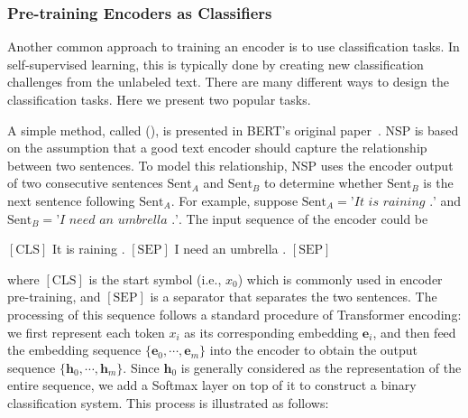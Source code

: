 \subsubsection{Pre-training Encoders as Classifiers}
\label{sec:pre-training-as-classification}

\noindent Another common approach to training an encoder is to use classification tasks. In self-supervised learning, this is typically done by creating new classification challenges from the unlabeled text. There are many different ways to design the classification tasks. Here we present two popular tasks.

A simple method, called  (), is presented in BERT's original paper~\cite{devlin-etal:2019bert}. NSP is based on the assumption that a good text encoder should capture the relationship between two sentences. To model this relationship, NSP uses the encoder output of two consecutive sentences $\mathrm{Sent}_{A}$ and $\mathrm{Sent}_{B}$ to determine whether $\mathrm{Sent}_{B}$ is the next sentence following $\mathrm{Sent}_{A}$. For example, suppose $\mathrm{Sent}_{A} = \textit{'It is raining .'}$ and $\mathrm{Sent}_{B} = \textit{'I need an umbrella .'}$. The input sequence of the encoder could be

\vspace{0.5em}
\begin{center}
$[\mathrm{CLS}]$ It is raining . $[\mathrm{SEP}]$ I need an umbrella . $[\mathrm{SEP}]$
\end{center}
\vspace{0.5em}

\noindent where $[\mathrm{CLS}]$ is the start symbol (i.e., $x_0$) which is commonly used in encoder pre-training, and $[\mathrm{SEP}]$ is a separator that separates the two sentences. The processing of this sequence follows a standard procedure of Transformer encoding: we first represent each token $x_i$ as its corresponding embedding $\mathbf{e}_i$, and then feed the embedding sequence $\{\mathbf{e}_{0},\cdots,\mathbf{e}_m\}$ into the encoder to obtain the output sequence $\{\mathbf{h}_{0},\cdots,\mathbf{h}_m\}$. Since $\mathbf{h}_{0}$ is generally considered as the representation of the entire sequence, we add a Softmax layer on top of it to construct a binary classification system. This process is illustrated as follows:


